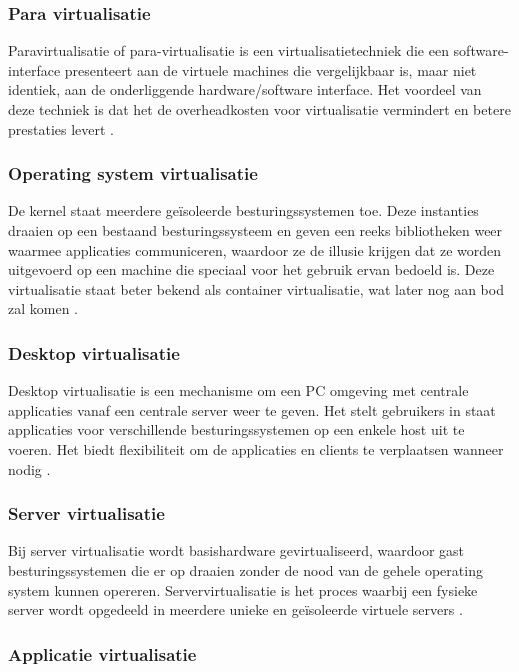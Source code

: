\subsubsection{Para virtualisatie}

Paravirtualisatie of para-virtualisatie is een virtualisatietechniek die een software-interface presenteert aan de virtuele machines die vergelijkbaar is, maar niet identiek, aan de onderliggende hardware/software interface. Het voordeel van deze techniek is dat het de overheadkosten voor virtualisatie vermindert en betere prestaties levert \autocite{Kedia2013}.

\subsubsection{Operating system virtualisatie}

De kernel staat meerdere geïsoleerde besturingssystemen toe. Deze instanties draaien op een bestaand besturingssysteem en geven een reeks bibliotheken weer waarmee applicaties communiceren, waardoor ze de illusie krijgen dat ze worden uitgevoerd op een machine die speciaal voor het gebruik ervan bedoeld is. Deze virtualisatie staat beter bekend als container virtualisatie, wat later nog aan bod zal komen \autocite{Kedia2013}.

\subsubsection{Desktop virtualisatie}

Desktop virtualisatie is een mechanisme om een PC omgeving met centrale applicaties vanaf een centrale server weer te geven. Het stelt gebruikers in staat applicaties voor verschillende besturingssystemen op een enkele host uit te voeren. Het biedt flexibiliteit om de applicaties en clients te verplaatsen wanneer nodig \autocite{Kedia2013}.

\subsubsection{Server virtualisatie}

Bij server virtualisatie wordt basishardware gevirtualiseerd, waardoor gast besturingssystemen die er op draaien zonder de nood van de gehele operating system kunnen opereren. Servervirtualisatie is het proces waarbij een fysieke server wordt opgedeeld in meerdere unieke en geïsoleerde virtuele servers \autocite{Kedia2013}.

\subsubsection{Applicatie virtualisatie}

